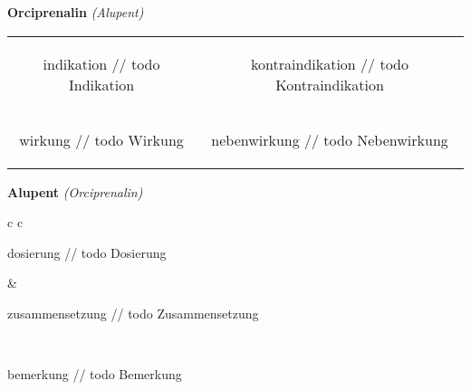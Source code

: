 \documentclass[12pt]{beamer}
\begin{document}
\begin{frame}{
    \textbf{Orciprenalin}
    \textit{(Alupent)}
}
    \begin{tabular}{c c}
        \begin{beamercolorbox}[wd=\boxwidth\textwidth,ht=\boxheight\textheight,sep=1em]{indikation}
        // todo Indikation
        \end{beamercolorbox} & 
        \begin{beamercolorbox}[wd=\boxwidth\textwidth,ht=\boxheight\textheight,sep=1em]{kontraindikation}
        // todo Kontraindikation 
        \end{beamercolorbox} \\
        \begin{beamercolorbox}[wd=\boxwidth\textwidth,ht=\boxheight\textheight,sep=1em]{wirkung}
        // todo Wirkung
        \end{beamercolorbox} & 
        \begin{beamercolorbox}[wd=\boxwidth\textwidth,ht=\boxheight\textheight,sep=1em]{nebenwirkung}
        // todo Nebenwirkung
        \end{beamercolorbox} \\
    \end{tabular}
\end{frame}

\begin{frame}{
    \textbf{Alupent}
    \textit{(Orciprenalin)}
}
    \begin{tabular}{c c}
        \begin{beamercolorbox}[wd=\boxwidth\textwidth,ht=\boxheight\textheight,sep=1em]{dosierung}
        // todo Dosierung
        \end{beamercolorbox} & 
        \begin{beamercolorbox}[wd=\boxwidth\textwidth,ht=\boxheight\textheight,sep=1em]{zusammensetzung}
        // todo Zusammensetzung
        \end{beamercolorbox} \\
        \begin{beamercolorbox}[wd=\textwidth,ht=\boxheight\textheight,sep=1em]{bemerkung}
        // todo Bemerkung
        \end{beamercolorbox} \\
    \end{tabular}
\end{frame}
\end{document}
